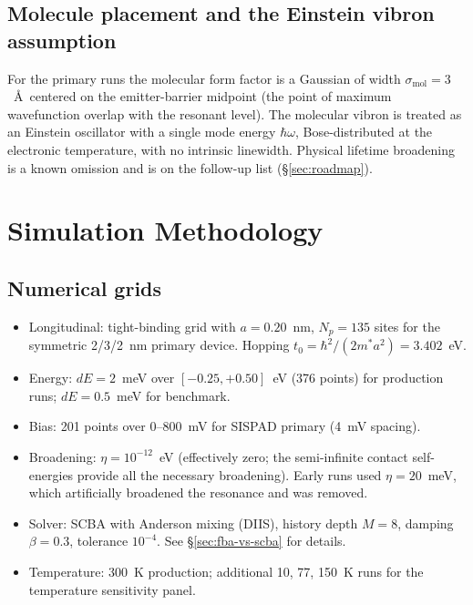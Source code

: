 \documentclass[11pt,a4paper,onecolumn]{article}
\begin{document}
\subsection{Molecule placement and the Einstein vibron assumption}
For the primary runs the molecular form factor is a Gaussian of width
$\sigma_{\mathrm{mol}} = 3$~\AA\ centered on the emitter-barrier midpoint
(the point of maximum wavefunction overlap with the resonant level). The
molecular vibron is treated as an Einstein oscillator with a single mode
energy $\hbar\omega$, Bose-distributed at the electronic temperature, with
no intrinsic linewidth. Physical lifetime broadening is a known omission
and is on the follow-up list (\S\ref{sec:roadmap}).

\section{Simulation Methodology}
\label{sec:methodology}

\subsection{Numerical grids}
\begin{itemize}[leftmargin=1.3em,itemsep=0pt]
\item Longitudinal: tight-binding grid with $a = 0.20$~nm,
$N_p = 135$ sites for the symmetric 2/3/2~nm primary device. Hopping
$t_0 = \hbar^2/(2m^* a^2) = 3.402$~eV.
\item Energy: $dE = 2$~meV over $[-0.25, +0.50]$~eV (376 points) for
production runs; $dE = 0.5$~meV for benchmark.
\item Bias: 201 points over 0--800~mV for SISPAD primary (4~mV spacing).
\item Broadening: $\eta = 10^{-12}$~eV (effectively zero; the semi-infinite
contact self-energies provide all the necessary broadening). Early runs
used $\eta = 20$~meV, which artificially broadened the resonance and was
removed.
\item Solver: SCBA with Anderson mixing (DIIS), history depth $M=8$,
damping $\beta = 0.3$, tolerance $10^{-4}$. See
\S\ref{sec:fba-vs-scba} for details.
\item Temperature: 300~K production; additional 10, 77, 150~K runs for
the temperature sensitivity panel.
\end{itemize}
\end{document}
